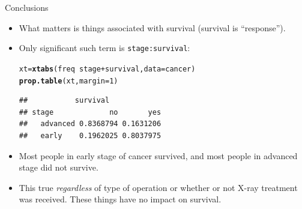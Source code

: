 \documentclass[unknownkeysallowed]{beamer}\usepackage[]{graphicx}\usepackage[]{color}
\makeatletter
\newcommand{\hlnum}[1]{\textcolor[rgb]{0.686,0.059,0.569}{#1}}%
\newcommand{\hlopt}[1]{\textcolor[rgb]{0,0,0}{#1}}%
\newcommand{\hlstd}[1]{\textcolor[rgb]{0.345,0.345,0.345}{#1}}%
\newcommand{\hlkwb}[1]{\textcolor[rgb]{0.69,0.353,0.396}{#1}}%
\newcommand{\hlkwc}[1]{\textcolor[rgb]{0.333,0.667,0.333}{#1}}%
\newcommand{\hlkwd}[1]{\textcolor[rgb]{0.737,0.353,0.396}{\textbf{#1}}}%
\newenvironment{kframe}{%
 \def\at@end@of@kframe{}%
 \ifinner\ifhmode%
  \def\at@end@of@kframe{\end{minipage}}%
  \begin{minipage}{\columnwidth}%
 \fi\fi%
 \def\FrameCommand##1{\hskip\@totalleftmargin \hskip-\fboxsep
 \colorbox{shadecolor}{##1}\hskip-\fboxsep
     \hskip-\linewidth \hskip-\@totalleftmargin \hskip\columnwidth}%
 \MakeFramed {\advance\hsize-\width
   \@totalleftmargin\z@ \linewidth\hsize
   \@setminipage}}%
 {\par\unskip\endMakeFramed%
 \at@end@of@kframe}
\newenvironment{knitrout}{}{} %
\makeatother
\begin{document}
\begin{frame}[fragile]{Conclusions}
  
  \begin{itemize}
  \item What matters is things associated with survival (survival is
    ``response'').
  \item Only significant such term is \texttt{stage:survival}:
\begin{knitrout}
\color{fgcolor}\begin{kframe}
\begin{alltt}
\hlstd{xt}\hlkwb{=}\hlkwd{xtabs}\hlstd{(freq}\hlopt{~}\hlstd{stage}\hlopt{+}\hlstd{survival,}\hlkwc{data}\hlstd{=cancer)}
\hlkwd{prop.table}\hlstd{(xt,}\hlkwc{margin}\hlstd{=}\hlnum{1}\hlstd{)}
\end{alltt}
\begin{verbatim}
##           survival
## stage             no       yes
##   advanced 0.8368794 0.1631206
##   early    0.1962025 0.8037975
\end{verbatim}
\end{kframe}
\end{knitrout}
\item Most people in early stage of cancer survived, and most people
  in advanced stage did not survive.
\item This true \emph{regardless} of type of operation or whether or
  not X-ray treatment was received. These things have no impact on
  survival. 
  \end{itemize}
  
\end{frame}
\end{document}
